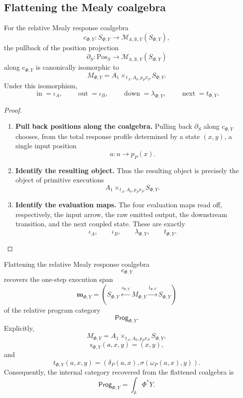 \subsection{Flattening the Mealy coalgebra}
\label{subsec:poly-relative-flattening-mealy-coalgebra}

\begin{lemma}
\label{lem:poly-relative-mealy-position-pullback}
For the relative Mealy response coalgebra
\[
c_{\Phi,Y}:S_{\Phi,Y}\to
\mathcal M_{\mathbb A,\mathbb B,Y}(S_{\Phi,Y}),
\]
the pullback of the position projection
\[
\partial_S:\mathrm{Pos}_S\to
\mathcal M_{\mathbb A,\mathbb B,Y}(S_{\Phi,Y})
\]
along \(c_{\Phi,Y}\) is canonically isomorphic to
\[
M_{\Phi,Y}
=
A_1\times_{t_A,A_0,p_P\pi_P}S_{\Phi,Y}.
\]
Under this isomorphism,
\[
\operatorname{in}=\iota_A,
\qquad
\operatorname{out}=\iota_B,
\qquad
\operatorname{down}=\lambda_{\Phi,Y},
\qquad
\operatorname{next}=t_{\Phi,Y}.
\]
\end{lemma}

\begin{proof}
\leavevmode
\begin{enumerate}
\item \textbf{Pull back positions along the coalgebra.}
Pulling back \(\partial_S\) along \(c_{\Phi,Y}\) chooses, from the total
response profile determined by a state \((x,y)\), a single input position
\[
a:u\to p_P(x).
\]

\item \textbf{Identify the resulting object.}
Thus the resulting object is precisely the object of primitive executions
\[
A_1\times_{t_A,A_0,p_P\pi_P}S_{\Phi,Y}.
\]

\item \textbf{Identify the evaluation maps.}
The four evaluation maps read off, respectively, the input arrow, the raw
emitted output, the downstream transition, and the next coupled state.  These
are exactly
\[
\iota_A,\qquad
\iota_B,\qquad
\lambda_{\Phi,Y},\qquad
t_{\Phi,Y}.
\]
\end{enumerate}
\end{proof}

\begin{theorem}
\label{thm:poly-relative-program-category-recovered}
Flattening the relative Mealy response coalgebra
\[
c_{\Phi,Y}
\]
recovers the one-step execution span
\[
\mathbf m_{\Phi,Y}
=
\left(
S_{\Phi,Y}
\xleftarrow{s_{\Phi,Y}}
M_{\Phi,Y}
\xrightarrow{t_{\Phi,Y}}
S_{\Phi,Y}
\right)
\]
of the relative program category
\[
\mathsf{Prog}_{\Phi,Y}.
\]
Explicitly,
\[
M_{\Phi,Y}
=
A_1\times_{t_A,A_0,p_P\pi_P}S_{\Phi,Y},
\]
\[
s_{\Phi,Y}(a,x,y)=(x,y),
\]
and
\[
t_{\Phi,Y}(a,x,y)
=
\left(
\delta_P(a,x),
\sigma(\omega_P(a,x),y)
\right).
\]
Consequently, the internal category recovered from the flattened coalgebra is
\[
\mathsf{Prog}_{\Phi,Y}
=
\int_{\mathbb A}\Phi^\ast Y.
\]
\end{theorem}

